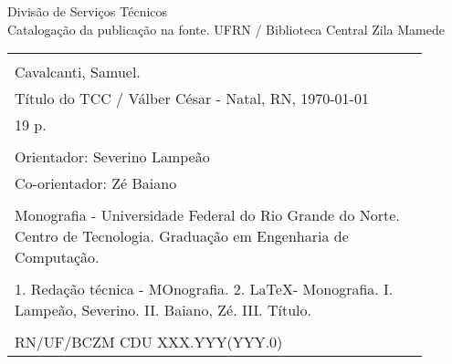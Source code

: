 %
%

\newpage

\begin{center}

\vspace*{\fill}

Divisão de Serviços Técnicos\\[1ex]
Catalogação da publicação na fonte.
UFRN / Biblioteca Central Zila Mamede

\vspace{2ex}

\begin{tabular}{|p{0.9\linewidth}|} \hline
\\ Cavalcanti, Samuel.\\
\hspace{1em} Título do TCC /
Válber César - Natal, RN, \today \\
\hspace{1em} 19 p. \\
\\
\hspace{1em} Orientador: Severino Lampeão \\
\hspace{1em} Co-orientador: Zé Baiano \\
\\
\hspace{1em} Monografia - Universidade Federal do Rio Grande do Norte.
Centro de Tecnologia. Graduação em Engenharia de Computação. \\
\\
\hspace{1em} 1. Redação técnica - MOnografia. 2. \LaTeX - Monografia. 
I. Lampeão, Severino. II. Baiano, Zé.
III. Título. \\
\\
RN/UF/BCZM \hfill CDU XXX.YYY(YYY.0) \\ \hline
\end{tabular} 

\end{center}
